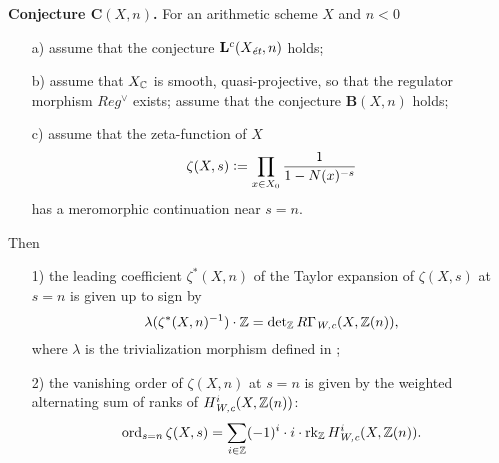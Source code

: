 \begin{nameless}\textbf{Conjecture $\mathbf{C} (X,n)$.}
  \label{conjecture:C(X,n)}
  For an arithmetic scheme $X$ and $n < 0$

  \begin{enumerate}
  \item[a)] assume that the conjecture $\mathbf{L}^c (X_\text{\it ét}, n)$
    holds;

  \item[b)] assume that $X_{\mathbb{C}}$ is smooth, quasi-projective, so that the
    regulator morphism $Reg^\vee$ exists; assume that the conjecture
    $\mathbf{B} (X,n)$ holds;

  \item[c)] assume that the zeta-function of $X$
    $$\zeta (X,s) \mathrel{\mathop:}= \prod_{x\in X_0} \frac{1}{1 - N (x)^{-s}}$$
    has a meromorphic continuation near $s=n$.
  \end{enumerate}

  Then

  \begin{enumerate}
  \item[1)] the leading coefficient $\zeta^* (X,n)$ of the Taylor expansion of
    $\zeta (X,s)$ at $s = n$ is given up to sign by
    \[ \lambda (\zeta^* (X,n)^{-1})\cdot \mathbb{Z} =
      \det\nolimits_{\mathbb{Z}} R\Gamma_\text{\it W,c} (X, \mathbb{Z} (n)), \]
    where $\lambda$ is the trivialization morphism defined in
    ;

  \item[2)] the vanishing order of $\zeta (X,n)$ at $s = n$ is given by the
    weighted alternating sum of ranks of $H^i_\text{\it W,c} (X, \mathbb{Z} (n))$:
    \begin{equation}
      \label{eqn:formula-for-vanishing-order}
      \operatorname{ord}_{s=n} \zeta (X,s) =
      \sum_{i\in\mathbb{Z}} (-1)^i \cdot i \cdot \operatorname{rk}_{\mathbb{Z}} H^i_\text{\it W,c} (X, \mathbb{Z} (n)).
    \end{equation}
  \end{enumerate}
\end{nameless}


